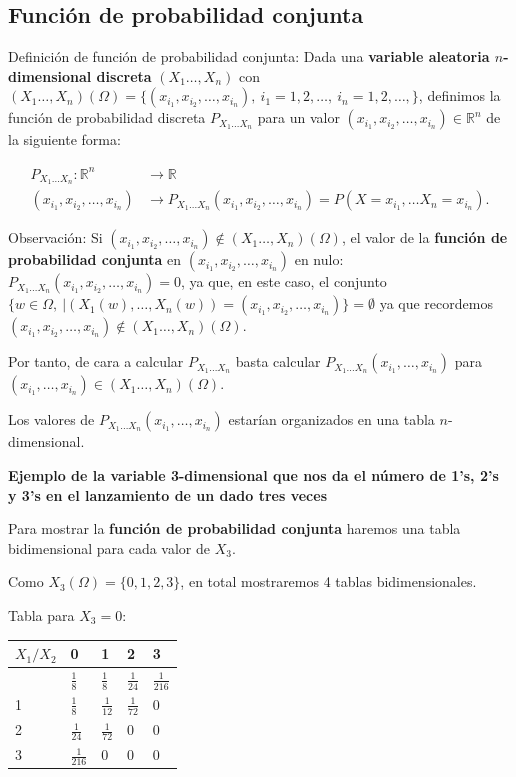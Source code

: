 \documentclass[
  letterpaper,
  DIV=11,
  numbers=noendperiod]{scrreprt}
\begin{document}
\hypertarget{funciuxf3n-de-probabilidad-conjunta-1}{%
\subsection{Función de probabilidad
conjunta}\label{funciuxf3n-de-probabilidad-conjunta-1}}

Definición de función de probabilidad conjunta: Dada una
\textbf{variable aleatoria \(n\)-dimensional discreta}
\((X_1\ldots,X_n)\) con
\((X_1\ldots,X_n)(\Omega)=\{(x_{i_1},x_{i_2},\ldots,x_{i_n}),\ i_1=1,2,\ldots,\ i_n=1,2,\ldots,\}\),
definimos la función de probabilidad discreta \(P_{X_1\ldots X_n}\) para
un valor \((x_{i_1},x_{i_2},\ldots,x_{i_n})\in\mathbb{R}^n\) de la
siguiente forma:

\[
\begin{array}{rl}
P_{X_1\ldots X_n}: \mathbb{R}^n & \longrightarrow \mathbb{R}\\
(x_{i_1},x_{i_2},\ldots,x_{i_n}) & \longrightarrow P_{X_1\ldots X_n}(x_{i_1},x_{i_2},\ldots,x_{i_n})=P(X= x_{i_1},\ldots X_n= x_{i_n}).
\end{array}
\]

Observación: Si
\((x_{i_1},x_{i_2},\ldots,x_{i_n})\not\in (X_1\ldots,X_n)(\Omega)\), el
valor de la \textbf{función de probabilidad conjunta} en
\((x_{i_1},x_{i_2},\ldots,x_{i_n})\) en nulo:
\(P_{X_1\ldots X_n}(x_{i_1},x_{i_2},\ldots,x_{i_n})=0\), ya que, en este
caso, el conjunto
\(\{w\in\Omega,\ | (X_1(w),\ldots,X_n(w))=(x_{i_1},x_{i_2},\ldots,x_{i_n})\}=\emptyset\)
ya que recordemos
\((x_{i_1},x_{i_2},\ldots,x_{i_n})\not\in (X_1\ldots,X_n)(\Omega)\).

Por tanto, de cara a calcular \(P_{X_1\ldots X_n}\) basta calcular
\(P_{X_1\ldots X_n}(x_{i_1},\ldots,x_{i_n})\) para
\((x_{i_1},\ldots,x_{i_n})\in (X_1\ldots,X_n)(\Omega)\).

Los valores de \(P_{X_1\ldots X_n}(x_{i_1},\ldots,x_{i_n})\) estarían
organizados en una tabla \(n\)-dimensional.

\textbf{Ejemplo de la variable 3-dimensional que nos da el número de
1's, 2's y 3's en el lanzamiento de un dado tres veces}

Para mostrar la \textbf{función de probabilidad conjunta} haremos una
tabla bidimensional para cada valor de \(X_3\).

Como \(X_3(\Omega)=\{0,1,2,3\}\), en total mostraremos 4 tablas
bidimensionales.

Tabla para \(X_3=0\):

\begin{longtable}[]{@{}lllll@{}}
\toprule\noalign{}
\(X_1/X_2\) & 0 & 1 & 2 & 3 \\
\midrule\noalign{}
\endhead
\bottomrule\noalign{}
\endlastfoot
0 & \(\frac{1}{8}\) & \(\frac{1}{8}\) & \(\frac{1}{24}\) &
\(\frac{1}{216}\) \\
1 & \(\frac{1}{8}\) & \(\frac{1}{12}\) & \(\frac{1}{72}\) & \(0\) \\
2 & \(\frac{1}{24}\) & \(\frac{1}{72}\) & \(0\) & \(0\) \\
3 & \(\frac{1}{216}\) & \(0\) & \(0\) & \(0\) \\
\end{longtable}
\end{document}

